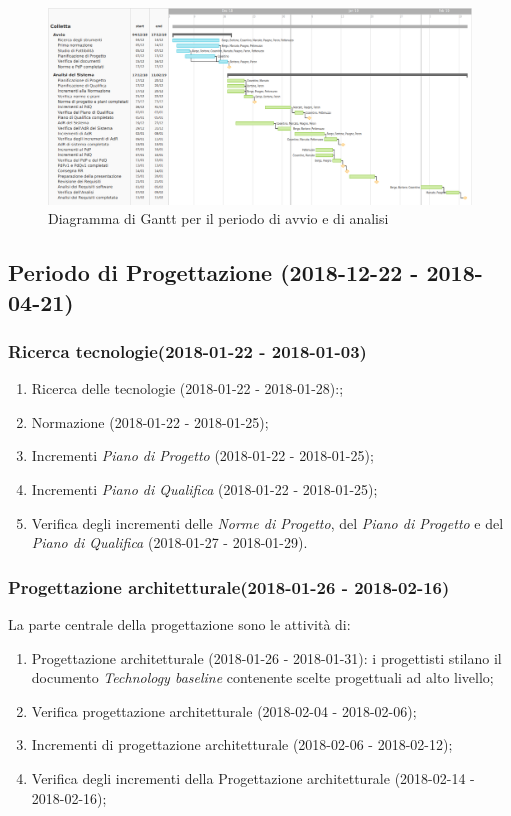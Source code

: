 	\begin{figure}[!hbtp]
		\centering
		\includegraphics[scale=0.5,angle=90]{images/ganttan.png}
		\caption{Diagramma di Gantt per il periodo di avvio e di analisi}
	\end{figure}
	\newpage
\subsection{Periodo di Progettazione (2018-12-22 - 2018-04-21)}	
		\subsubsection{Ricerca tecnologie(2018-01-22 - 2018-01-03)\\} 
			\begin{enumerate}
				\item Ricerca delle tecnologie (2018-01-22 - 2018-01-28):;
				\item Normazione (2018-01-22 - 2018-01-25);
				\item Incrementi \textit{Piano di Progetto} (2018-01-22 - 2018-01-25);
				\item Incrementi \textit{Piano di Qualifica} (2018-01-22 - 2018-01-25);
				\item Verifica degli incrementi delle \textit{Norme di Progetto}, del \textit{Piano di Progetto} e del \textit{Piano di Qualifica} (2018-01-27 - 2018-01-29).
			\end{enumerate}
		\subsubsection{Progettazione architetturale(2018-01-26 - 2018-02-16)\\} La parte centrale della progettazione sono le attività di:
			\begin{enumerate}
				\item Progettazione architetturale (2018-01-26 - 2018-01-31): i progettisti stilano il documento \textit{Technology baseline} contenente scelte progettuali ad alto livello;
				\item Verifica progettazione architetturale (2018-02-04 - 2018-02-06);
				\item Incrementi di progettazione architetturale (2018-02-06 - 2018-02-12);
				\item Verifica degli incrementi della Progettazione architetturale (2018-02-14 - 2018-02-16);
			\end{enumerate}
